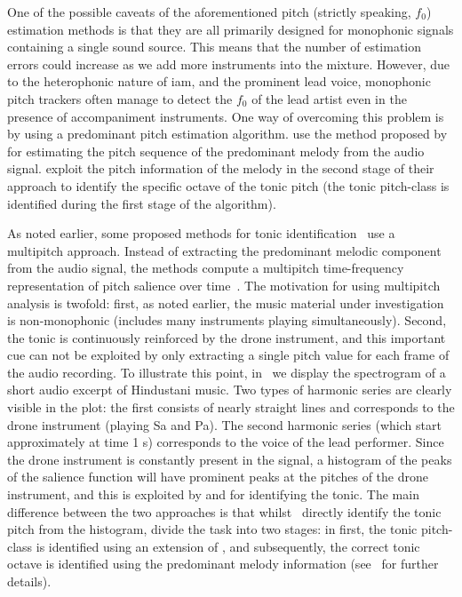 One of the possible caveats of the aforementioned pitch (strictly speaking, $f_0$) estimation methods is that they are all primarily designed for monophonic signals containing a single sound source. This means that the number of estimation errors could increase as we add more instruments into the mixture. However, due to the heterophonic nature of \gls{iam}, and the prominent lead voice, monophonic pitch trackers often manage to detect the $f_0$ of the lead artist even in the presence of accompaniment instruments. One way of overcoming this problem is by using a predominant pitch estimation algorithm. \cite{gulati2012two} use the method proposed by~\cite{Salamon2012} for estimating the pitch sequence of the predominant melody from the audio signal. \cite{gulati2012two} exploit the pitch information of the melody in the second stage of their approach to identify the specific octave of the tonic pitch (the tonic pitch-class is identified during the first stage of the algorithm).

As noted earlier, some proposed methods for tonic identification~\citep{salamon2012multipitch,gulati2012two} use a multipitch approach. Instead of extracting the predominant melodic component from the audio signal, the methods compute a multipitch time-frequency representation of pitch salience over time~\citep{Salamon2011}. The motivation for using multipitch analysis is twofold: first, as noted earlier, the music material under investigation is non-monophonic (includes many instruments playing simultaneously). Second, the tonic is continuously reinforced by the drone instrument, and this important cue can not be exploited by only extracting a single pitch value for each frame of the audio recording. To illustrate this point, in~ we display the spectrogram of a short audio excerpt of Hindustani music. Two types of harmonic series are clearly visible in the plot: the first consists of nearly straight lines and corresponds to the drone instrument (playing Sa and Pa). The second harmonic series (which start approximately at time 1 s) corresponds to the voice of the lead performer. Since the drone instrument is constantly present in the signal, a histogram of the peaks of the salience function will have prominent peaks at the pitches of the drone instrument, and this is exploited by \cite{salamon2012multipitch} and \cite{gulati2012two} for identifying the tonic. The main difference between the two approaches is that whilst~\cite{salamon2012multipitch} directly identify the tonic pitch from the histogram, \cite{gulati2012two} divide the task into two stages: in first, the tonic pitch-class is identified using an extension of \cite{salamon2012multipitch}, and subsequently, the correct tonic octave is identified using the predominant melody information (see~\cite{Gulati2014Tonic} for further details).

